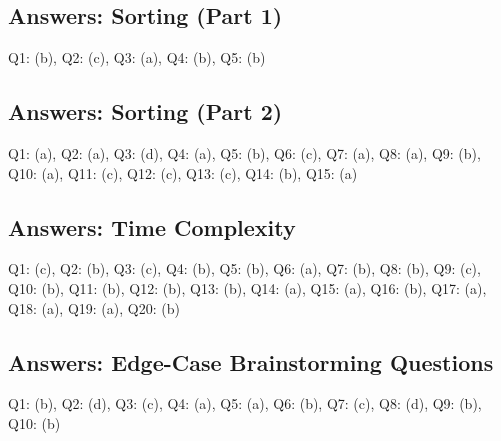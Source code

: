 \subsection*{Answers: Sorting (Part 1)}
Q1: (b), Q2: (c), Q3: (a), Q4: (b), Q5: (b)

\subsection*{Answers: Sorting (Part 2)}
Q1: (a), Q2: (a), Q3: (d), Q4: (a), Q5: (b), Q6: (c),  
Q7: (a), Q8: (a), Q9: (b), Q10: (a), Q11: (c), Q12: (c),  
Q13: (c), Q14: (b), Q15: (a)

\subsection*{Answers: Time Complexity}
Q1: (c), Q2: (b), Q3: (c), Q4: (b), Q5: (b), Q6: (a), 
Q7: (b), Q8: (b), Q9: (c), Q10: (b), Q11: (b), Q12: (b), 
Q13: (b), Q14: (a), Q15: (a), Q16: (b), Q17: (a), Q18: (a), 
Q19: (a), Q20: (b)

\subsection*{Answers: Edge-Case Brainstorming Questions}
Q1: (b), Q2: (d), Q3: (c), Q4: (a), Q5: (a), Q6: (b), Q7: (c), Q8: (d), Q9: (b), Q10: (b)
